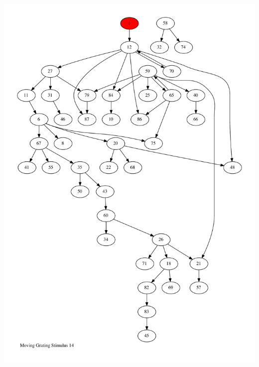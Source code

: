 \documentclass{article}
\begin{document}
\newpage
\includegraphics[max height=\textheight,max width=\textwidth]{stim_mov_grat/stim14_pp.pdf}
\end{document}
